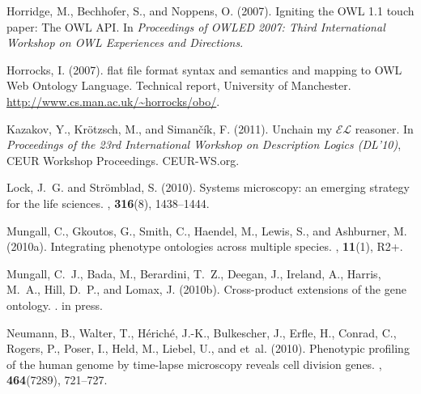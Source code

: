 \documentclass{bioinfo}
\begin{document}
\begin{thebibliography}{}
Horridge, M., Bechhofer, S., and Noppens, O. (2007).
\newblock Igniting the {OWL} 1.1 touch paper: The {OWL} {API}.
\newblock In {\em Proceedings of OWLED 2007: Third International Workshop on
  OWL Experiences and Directions\/}.

Horrocks, I. (2007).
 flat file format syntax and semantics and mapping to {OWL}
  {W}eb {O}ntology {L}anguage.
\newblock Technical report, University of Manchester.
\newblock \url{http://www.cs.man.ac.uk/~horrocks/obo/}.

Kazakov, Y., Kr{\"o}tzsch, M., and Siman\v{c}\'{i}k, F. (2011).
\newblock Unchain my $\mathcal{EL}$ reasoner.
\newblock In {\em Proceedings of the 23rd International Workshop on Description
  Logics (DL'10)\/}, CEUR Workshop Proceedings. CEUR-WS.org.

Lock, J.~G. and Strömblad, S. (2010).
\newblock Systems microscopy: an emerging strategy for the life sciences.
, {\bf 316}(8), 1438--1444.

Mungall, C., Gkoutos, G., Smith, C., Haendel, M., Lewis, S., and Ashburner, M.
  (2010a).
\newblock Integrating phenotype ontologies across multiple species.
, {\bf 11}(1), R2+.

Mungall, C.~J., Bada, M., Berardini, T.~Z., Deegan, J., Ireland, A., Harris,
  M.~A., Hill, D.~P., and Lomax, J. (2010b).
\newblock Cross-product extensions of the gene ontology.
.
\newblock in press.

Neumann, B., Walter, T., Hériché, J.-K., Bulkescher, J., Erfle, H., Conrad,
  C., Rogers, P., Poser, I., Held, M., Liebel, U., and et~al. (2010).
\newblock Phenotypic profiling of the human genome by time-lapse microscopy
  reveals cell division genes.
, {\bf 464}(7289), 721--727.


\end{thebibliography}
\end{document}

